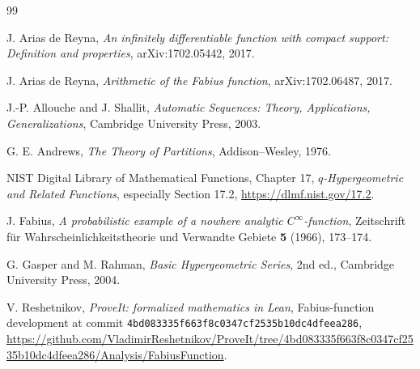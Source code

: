\documentclass[11pt]{article}
\theoremstyle{definition}
\begin{document}
\begin{thebibliography}{99}

J. Arias de Reyna,
\emph{An infinitely differentiable function with compact support: Definition and properties},
arXiv:1702.05442, 2017.

J. Arias de Reyna,
\emph{Arithmetic of the Fabius function},
arXiv:1702.06487, 2017.

J.-P. Allouche and J. Shallit,
\emph{Automatic Sequences: Theory, Applications, Generalizations},
Cambridge University Press, 2003.

G. E. Andrews,
\emph{The Theory of Partitions},
Addison--Wesley, 1976.

NIST Digital Library of Mathematical Functions,
Chapter 17, \emph{$q$-Hypergeometric and Related Functions},
especially Section 17.2,
\url{https://dlmf.nist.gov/17.2}.

J. Fabius,
\emph{A probabilistic example of a nowhere analytic $C^\infty$-function},
Zeitschrift f\"ur Wahrscheinlichkeitstheorie und Verwandte Gebiete
\textbf{5} (1966), 173--174.

G. Gasper and M. Rahman,
\emph{Basic Hypergeometric Series}, 2nd ed.,
Cambridge University Press, 2004.

V. Reshetnikov,
\emph{ProveIt: formalized mathematics in Lean},
Fabius-function development at commit
\texttt{4bd083335f663f8c0347cf2535b10dc4dfeea286},
\url{https://github.com/VladimirReshetnikov/ProveIt/tree/4bd083335f663f8c0347cf2535b10dc4dfeea286/Analysis/FabiusFunction}.

\end{thebibliography}
\end{document}
